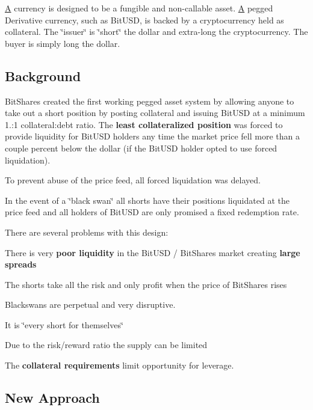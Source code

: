 \mbox{\hyperlink{struct_a}{A}} currency is designed to be a fungible and non-\/callable asset. \mbox{\hyperlink{struct_a}{A}} pegged Derivative currency, such as Bit\+U\+SD, is backed by a cryptocurrency held as collateral. The \char`\"{}issuer\char`\"{} is \char`\"{}short\char`\"{} the dollar and extra-\/long the cryptocurrency. The buyer is simply long the dollar. ~\newline


\subsection*{Background }

Bit\+Shares created the first working pegged asset system by allowing anyone to take out a short position by posting collateral and issuing Bit\+U\+SD at a minimum 1.\+:1 collateral\+:debt ratio. The {\bfseries least collateralized position} was forced to provide liquidity for Bit\+U\+SD holders any time the market price fell more than a couple percent below the dollar (if the Bit\+U\+SD holder opted to use forced liquidation).

To prevent abuse of the price feed, all forced liquidation was delayed.

In the event of a \char`\"{}black swan\char`\"{} all shorts have their positions liquidated at the price feed and all holders of Bit\+U\+SD are only promised a fixed redemption rate.

There are several problems with this design\+:


\begin{DoxyEnumerate}
\item There is very {\bfseries poor liquidity} in the Bit\+U\+SD / Bit\+Shares market creating {\bfseries large spreads}
\item The shorts take all the risk and only profit when the price of Bit\+Shares rises
\item Blackswans are perpetual and very disruptive.
\item It is \char`\"{}every short for themselves\char`\"{}
\item Due to the risk/reward ratio the supply can be limited
\item The {\bfseries collateral requirements} limit opportunity for leverage.
\end{DoxyEnumerate}

\subsection*{New Approach }


